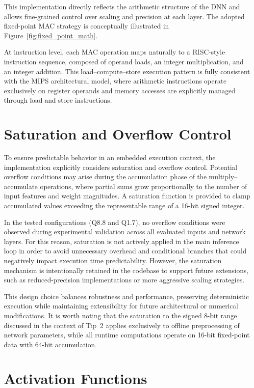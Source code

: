 This implementation directly reflects the arithmetic structure of the DNN and
allows fine-grained control over scaling and precision at each layer.
The adopted fixed-point MAC strategy is conceptually illustrated in
Figure~\ref{fig:fixed_point_math}.

At instruction level, each MAC operation maps naturally to a RISC-style
instruction sequence, composed of operand loads, an integer multiplication,
and an integer addition.
This load--compute--store execution pattern is fully consistent with the MIPS
architectural model, where arithmetic instructions operate exclusively on
register operands and memory accesses are explicitly managed through load and
store instructions.


\section{Saturation and Overflow Control}

To ensure predictable behavior in an embedded execution context, the
implementation explicitly considers saturation and overflow control.
Potential overflow conditions may arise during the accumulation phase of the
multiply--accumulate operations, where partial sums grow proportionally to the
number of input features and weight magnitudes.
A saturation function is provided to clamp accumulated values exceeding the
representable range of a 16-bit signed integer.

In the tested configurations (Q8.8 and Q1.7), no overflow conditions were observed
during experimental validation across all evaluated inputs and network layers.
For this reason, saturation is not actively applied in the main inference loop in
order to avoid unnecessary overhead and conditional branches that could negatively
impact execution time predictability.
However, the saturation mechanism is intentionally retained in the codebase to
support future extensions, such as reduced-precision implementations or more
aggressive scaling strategies.

This design choice balances robustness and performance, preserving deterministic
execution while maintaining extensibility for future architectural or numerical
modifications.
It is worth noting that the saturation to the signed 8-bit range discussed in
the context of Tip~2 applies exclusively to offline preprocessing of network
parameters, while all runtime computations operate on 16-bit fixed-point data
with 64-bit accumulation.


\section{Activation Functions}

